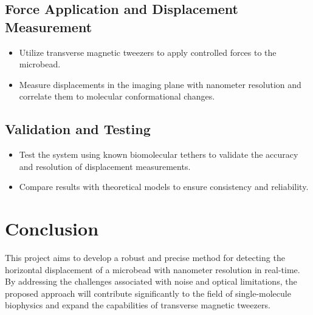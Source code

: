 \documentclass[12pt]{article}
\begin{document}
\subsection*{Force Application and Displacement Measurement}
\begin{itemize}
    \item Utilize transverse magnetic tweezers to apply controlled forces to the microbead.
    \item Measure displacements in the imaging plane with nanometer resolution and correlate them to molecular conformational changes.
\end{itemize}

\subsection*{Validation and Testing}
\begin{itemize}
    \item Test the system using known biomolecular tethers to validate the accuracy and resolution of displacement measurements.
    \item Compare results with theoretical models to ensure consistency and reliability.
\end{itemize}

\section*{Conclusion}
This project aims to develop a robust and precise method for detecting the horizontal displacement of a microbead with nanometer resolution in real-time. By addressing the challenges associated with noise and optical limitations, the proposed approach will contribute significantly to the field of single-molecule biophysics and expand the capabilities of transverse magnetic tweezers.
\end{document}
